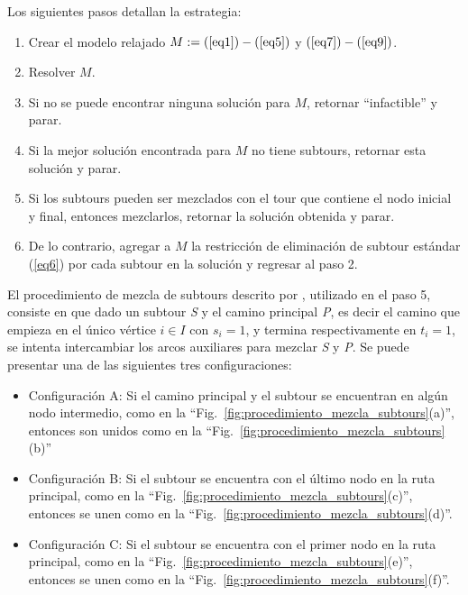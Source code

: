 Los siguientes pasos detallan la estrategia:

\begin{enumerate}
\item Crear el modelo relajado $M: = (\ref{eq1}) - (\ref{eq5})$ y $(\ref{eq7}) - (\ref{eq9})$.
\item Resolver $M$.
\item Si no se puede encontrar ninguna solución para $M$, retornar ``infactible'' y parar.
\item Si la mejor solución encontrada para $M$ no tiene subtours, retornar esta solución y parar.
\item Si los subtours pueden ser mezclados con el tour que contiene el nodo inicial y final, entonces mezclarlos, retornar la solución obtenida y parar.
\item De lo contrario, agregar a $M$ la restricción de eliminación de subtour estándar (\ref{eq6}) por cada subtour en la solución y regresar al paso 2.
\end{enumerate}

El procedimiento de mezcla de subtours descrito por \citet{Braier2017AnArgentina}, utilizado en el paso 5, consiste en que dado un subtour \textit{S} y el camino principal \textit{P}, es decir el camino que empieza en el único vértice $i \in I$ con $s_i = 1$, y termina respectivamente en $t_i = 1$, se intenta intercambiar los arcos auxiliares para mezclar \textit{S} y \textit{P}. Se puede presentar una de las siguientes tres configuraciones:

\begin{itemize}
    \item Configuración A: Si el camino principal y el subtour se encuentran en algún nodo intermedio, como en la ``Fig.~\ref{fig:procedimiento_mezcla_subtours}(a)'', entonces son unidos como en la ``Fig.~\ref{fig:procedimiento_mezcla_subtours}(b)''
    \item Configuración B: Si el subtour se encuentra con el último nodo en la ruta principal, como en la ``Fig.~\ref{fig:procedimiento_mezcla_subtours}(c)'', entonces se unen como en la ``Fig.~\ref{fig:procedimiento_mezcla_subtours}(d)''.
    \item Configuración C: Si el subtour se encuentra con el primer nodo en la ruta principal, como en la ``Fig.~\ref{fig:procedimiento_mezcla_subtours}(e)'', entonces se unen como en la ``Fig.~\ref{fig:procedimiento_mezcla_subtours}(f)''.
\end{itemize}

